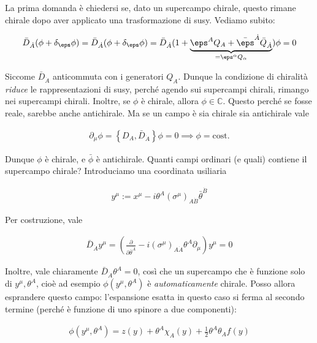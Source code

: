 \documentclass{report}
\begin{document}
La prima domanda è chiedersi se, dato un supercampo chirale, questo rimane chirale dopo aver applicato una trasformazione di susy. Vediamo subito: 

\begin{align}
    \bar{D}_{\dot{A}}(\phi + \delta_\eps \phi) = \bar{D}_{\dot{A}}(\phi + \delta_\eps \phi) = \bar{D}_{\dot{A}}(1 + \underbrace{\eps^A Q_A  + \bar{\eps}^{\dot{A}}\bar{Q}_{\dot{A}}}_{= \eps^\alpha Q_\alpha})\phi = 0 
\end{align}

Siccome \(\bar{D}_{\dot{A}}\) anticommuta con i generatori \(Q_A\). Dunque la condizione di chiralità \emph{riduce} le rappresentazioni di susy, perché agendo sui supercampi chirali, rimango nei supercampi chirali. Inoltre, se \(\phi\) è chirale, allora \(\phi \in \mathbb{C}\). Questo perché se fosse reale, sarebbe anche antichirale. Ma se un campo è sia chirale sia antichirale vale 

\begin{align}
    \partial_\mu \phi = \left\{ D_A, \bar{D}_{\dot{A}} \right\}\phi = 0 \implies \phi = \text{cost.}
\end{align}

Dunque \(\phi\) è chirale, e \(\bar{\phi}\) è antichirale. Quanti campi ordinari (e quali) contiene il supercampo chirale? Introduciamo una coordinata usiliaria 

\begin{align}
    y^\mu := x^\mu - i\theta^A (\sigma^\mu)_{A\dot{B}}\bar{\theta}^{\dot{B}}
\end{align}

Per costruzione, vale 

\begin{align}
    \bar{D}_{\dot{A}}y^\mu = \left(\frac{\partial}{\partial \bar{\theta}^{\dot{A}}} -i(\sigma^\mu)_{A\dot{A}}\theta^A \partial_\mu \right)y^\mu = 0 
\end{align}

Inoltre, vale chiaramente \(\bar{D}_{\dot{A}}\theta^A = 0\), così che un supercampo che è funzione solo di \(y^\mu, \theta^A\), cioè ad esempio \(\phi(y^\mu, \theta^A)\) è \emph{automaticamente} chirale. Posso allora esprandere questo campo: l'espansione esatta in questo caso si ferma al secondo termine (perché è funzione di uno spinore a due componenti): 

\begin{align}
    \phi(y^\mu, \theta^A) = z(y) + \theta^A \chi_A(y) + \frac{1}{2}\theta^A \theta_A f(y)
\end{align}
 
\end{document}
